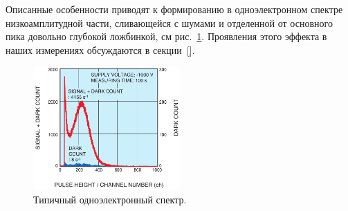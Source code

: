 Описанные особенности приводят к формированию в одноэлектронном спектре низкоамплитудной части, сливающейся с шумами и отделенной от основного пика довольно глубокой ложбинкой, см рис.~\ref{fig:SPEspectrum}. Проявления этого эффекта в наших измерениях обсуждаются в секции~\ref{}.

\begin{figure}
\includegraphics[width=0.5\textwidth]{pictures/3_Typical_spectrum_from_H12700.png}
\caption{Типичный одноэлектронный спектр.}
\label{fig:SPEspectrum}
\end{figure}
